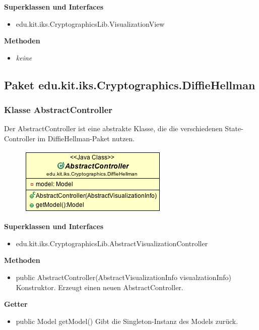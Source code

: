 \documentclass{article}
\begin{document}
      \textbf{Superklassen und Interfaces}
      \begin{itemize}
        \item edu.kit.iks.CryptographicsLib.VisualizationView
      \end{itemize}

      \textbf{Methoden}
      \begin{itemize}
        \item \textit{keine}
      \end{itemize}

\subsection{Paket edu.kit.iks.Cryptographics.DiffieHellman}
    \subsubsection{Klasse AbstractController}
      Der AbstractController ist eine abstrakte Klasse, die die verschiedenen State-Controller im DiffieHellman-Paket nutzen.
      \begin{figure}[H]
        \centering
        \includegraphics{resources/edu-kit-iks-Cryptographics-DiffieHellman-AbstractController}
      \end{figure}

      \textbf{Superklassen und Interfaces}
      \begin{itemize}
        \item edu.kit.iks.CryptographicsLib.AbstractVisualizationController
      \end{itemize}
      
      \textbf{Methoden}
      \begin{itemize}
        \item public AbstractController(AbstractVisualizationInfo visualzationInfo) \newline
        Konstruktor. Erzeugt einen neuen AbstractController.
      \end{itemize}

      \textbf{Getter}
      \begin{itemize}
        \item public Model getModel() \newline
        Gibt die Singleton-Instanz des Models zurück.
      \end{itemize}
\end{document}
